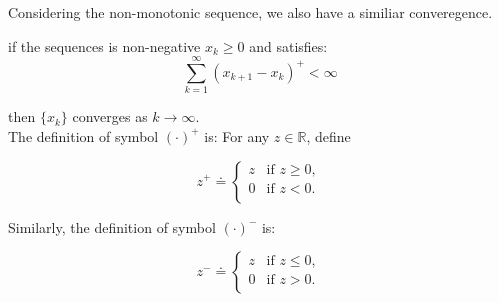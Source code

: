 Considering the non-monotonic sequence, we also have a similiar converegence.

\begin{theorem}
    if the sequences is non-negative $x_{k}\ge 0$ and satisfies:
    \begin{equation}\label{nonmono-condition}
        \sum_{k=1}^{\infty}(x_{k+1}-x_{k})^+ < \infty
    \end{equation}

    then $\{x_{k}\}$ converges as $k \to \infty$. \\
    The definition of symbol $(\cdot)^+$ is:
    For any $z \in \mathbb{R}$, define

    \begin{equation*}
        z^+ \doteq
            \begin{cases}
                z & \text{if } z\ge 0, \\ 
                0 & \text{if } z<0. \\
            \end{cases}
    \end{equation*}

    Similarly, the definition of symbol $(\cdot)^-$ is:

    \begin{equation*}
        z^- \doteq
            \begin{cases}
                z & \text{if } z\le 0, \\ 
                0 & \text{if } z>0. \\
            \end{cases}
    \end{equation*}
\end{theorem}

